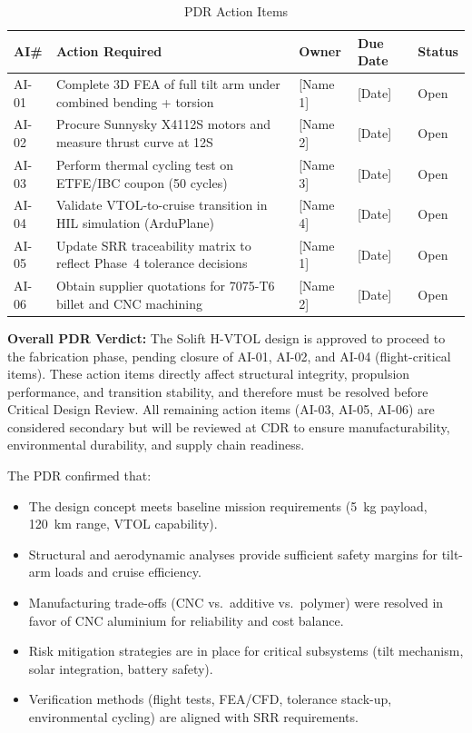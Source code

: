 \begin{table}[H]
\centering
\small
\caption{PDR Action Items}
\label{tab:actions}
\begin{tabularx}{\textwidth}{C{1cm} X L{3cm} C{2cm} C{1.5cm}}
\toprule
\textbf{AI\#} & \textbf{Action Required} & \textbf{Owner} & \textbf{Due Date} & \textbf{Status} \\
\midrule
AI-01 & Complete 3D FEA of full tilt arm under combined bending + torsion & [Name 1] & [Date] & Open \\
AI-02 & Procure Sunnysky X4112S motors and measure thrust curve at 12S & [Name 2] & [Date] & Open \\
AI-03 & Perform thermal cycling test on ETFE/IBC coupon (50 cycles) & [Name 3] & [Date] & Open \\
AI-04 & Validate VTOL-to-cruise transition in HIL simulation (ArduPlane) & [Name 4] & [Date] & Open \\
AI-05 & Update SRR traceability matrix to reflect Phase~4 tolerance decisions & [Name 1] & [Date] & Open \\
AI-06 & Obtain supplier quotations for 7075-T6 billet and CNC machining & [Name 2] & [Date] & Open \\
\bottomrule
\end{tabularx}
\end{table}

\noindent \textbf{Overall PDR Verdict:} The Solift H-VTOL design is approved to proceed to the fabrication phase, pending closure of AI-01, AI-02, and AI-04 (flight-critical items). These action items directly affect structural integrity, propulsion performance, and transition stability, and therefore must be resolved before Critical Design Review. All remaining action items (AI-03, AI-05, AI-06) are considered secondary but will be reviewed at CDR to ensure manufacturability, environmental durability, and supply chain readiness.

\noindent The PDR confirmed that:
\begin{itemize}[noitemsep]
    \item The design concept meets baseline mission requirements (5~kg payload, 120~km range, VTOL capability).
    \item Structural and aerodynamic analyses provide sufficient safety margins for tilt-arm loads and cruise efficiency.
    \item Manufacturing trade-offs (CNC vs.\ additive vs.\ polymer) were resolved in favor of CNC aluminium for reliability and cost balance.
    \item Risk mitigation strategies are in place for critical subsystems (tilt mechanism, solar integration, battery safety).
    \item Verification methods (flight tests, FEA/CFD, tolerance stack-up, environmental cycling) are aligned with SRR requirements.
\end{itemize}

